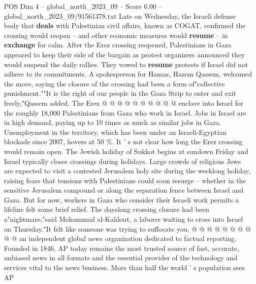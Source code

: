 \begin{textsample}{POS Dim 4 – global\_north\_2023\_09 – Score 6.00 – global\_north\_2023\_09/91561378.txt}
Late on Wednesday, the Israeli defense body that \textbf{deals} with Palestinian civil affairs, known as COGAT, confirmed the crossing would reopen -- and other economic measures would \textbf{resume} -- in \textbf{exchange} for calm.
After the Erez crossing reopened, Palestinians in Gaza appeared to keep their side of the bargain as protest organizers announced they would suspend the daily rallies.
They vowed to \textbf{resume} protests if Israel did not adhere to its commitments.
A spokesperson for Hamas, Hazem Qassem, welcomed the move, saying the closure of the crossing had been a form of"collective punishment.""It is the right of our people in the Gaza Strip to enter and exit freely,"Qassem added.
The Erez @ @ @ @ @ @ @ @ @ @ enclave into Israel for the roughly 18,000 Palestinians from Gaza who work in Israel.
Jobs in Israel are in high demand, paying up to 10 times as much as similar jobs in Gaza.
Unemployment in the territory, which has been under an Israeli-Egyptian blockade since 2007, hovers at 50 \%.
It ' s not clear how long the Erez crossing would remain open.
The Jewish holiday of Sukkot begins at sundown Friday and Israel typically closes crossings during holidays.
Large crowds of religious Jews are expected to visit a contested Jerusalem holy site during the weeklong holiday, raising fears that tensions with Palestinians could soon resurge -- whether in the sensitive Jerusalem compound or along the separation fence between Israel and Gaza.
But for now, workers in Gaza who consider their Israeli work permits a lifeline felt some brief relief.
The dayslong crossing closure had been a"nightmare,"said Mohammad al-Kahlout, a laborer waiting to cross into Israel on Thursday."It felt like someone was trying to suffocate you, @ @ @ @ @ @ @ @ @ @ an independent global news organization dedicated to factual reporting.
Founded in 1846, AP today remains the most trusted source of fast, accurate, unbiased news in all formats and the essential provider of the technology and services vital to the news business.
More than half the world ' s population sees AP

\end{textsample}
